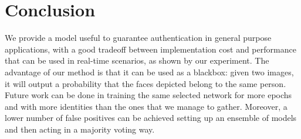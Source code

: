 \section{Conclusion}
We provide a model useful to guarantee authentication in general purpose applications, with a good tradeoff between implementation cost and performance that can be used in real-time scenarios, as shown by our experiment. The advantage of our method is that it can be used as a blackbox: given two images, it will output a probability that the faces depicted belong to the same person.
Future work can be done in training the same selected network for more epochs and with more identities than the ones that we manage to gather. Moreover, a lower number of false positives can be achieved setting up an ensemble of models and then acting in a majority voting way.
